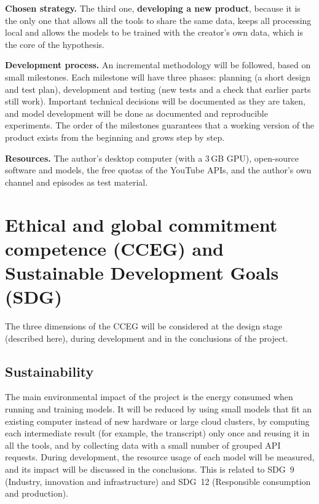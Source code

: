 \documentclass[ENG]{TFUOC}
\begin{document}
\textbf{Chosen strategy.} The third one, \textbf{developing a new product}, because it is the only one that allows all the tools to share the same data, keeps all processing local and allows the models to be trained with the creator's own data, which is the core of the hypothesis.

\textbf{Development process.} An incremental methodology will be followed, based on small milestones. Each milestone will have three phases: planning (a short design and test plan), development and testing (new tests and a check that earlier parts still work). Important technical decisions will be documented as they are taken, and model development will be done as documented and reproducible experiments. The order of the milestones guarantees that a working version of the product exists from the beginning and grows step by step.

\textbf{Resources.} The author's desktop computer (with a 3\,GB GPU), open-source software and models, the free quotas of the YouTube APIs, and the author's own channel and episodes as test material.

\section{Ethical and global commitment competence (CCEG) and Sustainable Development Goals (SDG)}

The three dimensions of the CCEG will be considered at the design stage (described here), during development and in the conclusions of the project.

\subsection*{Sustainability}

The main environmental impact of the project is the energy consumed when running and training models. It will be reduced by using small models that fit an existing computer instead of new hardware or large cloud clusters, by computing each intermediate result (for example, the transcript) only once and reusing it in all the tools, and by collecting data with a small number of grouped API requests. During development, the resource usage of each model will be measured, and its impact will be discussed in the conclusions. This is related to SDG~9 (Industry, innovation and infrastructure) and SDG~12 (Responsible consumption and production).
\end{document}
